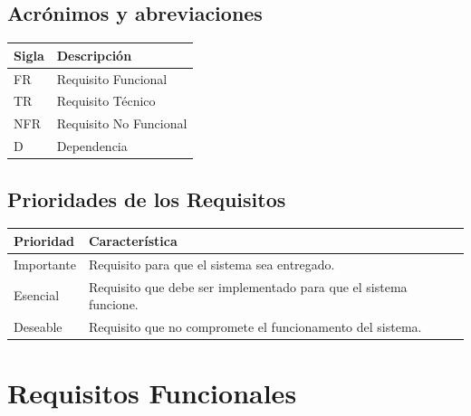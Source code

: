 \documentclass{article}
\begin{document}
  \subsection{Acrónimos y abreviaciones}
    \FloatBarrier
    \begin{table}[H]
      \begin{center}
        \begin{tabular}[pos]{|m{2cm} | m{12cm}|} 
          \hline
          \cellcolor[gray]{0.9}\textbf{Sigla} & \cellcolor[gray]{0.9}\textbf{Descripción} \\ \hline
          FR      & Requisito Funcional  \\ \hline
					TR      & Requisito Técnico  \\ \hline
          NFR     & Requisito No Funcional  \\ \hline
          D       & Dependencia  \\ \hline
        \end{tabular}
      \end{center}
    \end{table}  

  \subsection{Prioridades de los Requisitos}
    \FloatBarrier
    \begin{table}[H]
      \begin{center}
        \begin{tabular}[pos]{|m{2cm} | m{12cm}|} 
          \hline
          \cellcolor[gray]{0.9}\textbf{Prioridad} & \cellcolor[gray]{0.9}\textbf{Característica} \\ \hline
          Importante     & Requisito para que el sistema sea entregado.  \\ \hline
          Esencial       & Requisito que debe ser implementado para que el sistema funcione.  \\ \hline
          Deseable       & Requisito que no compromete el funcionamento del sistema.  \\ \hline
        \end{tabular}
      \end{center}
    \end{table}  

  \section{Requisitos Funcionales}
	
\end{document}
